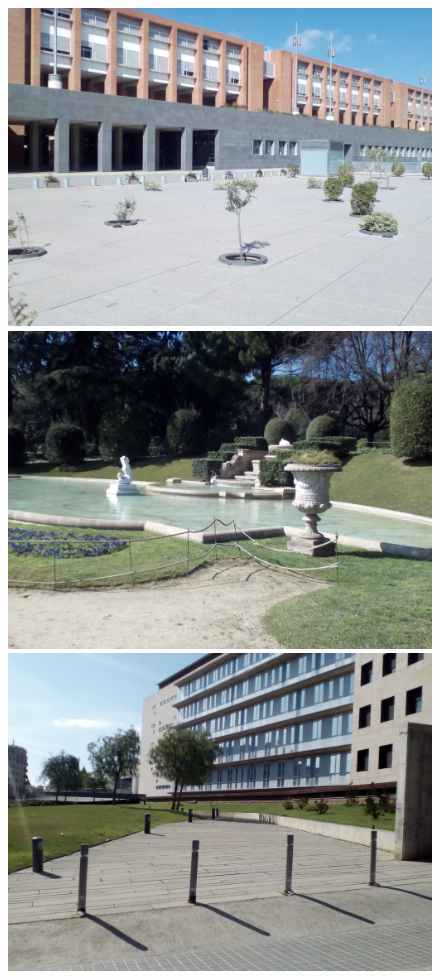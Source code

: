 		\begin{figure}[!htb]
				\includegraphics[width=\linewidth]{images/experiments/uni}
				\label{fig:awesome_image1}
			\endminipage\hfill
				\includegraphics[width=\linewidth]{images/experiments/jardi2}
				\label{fig:awesome_image2}
			\endminipage\hfill
				\includegraphics[width=\linewidth]{images/experiments/uni4}

\end{figure}
